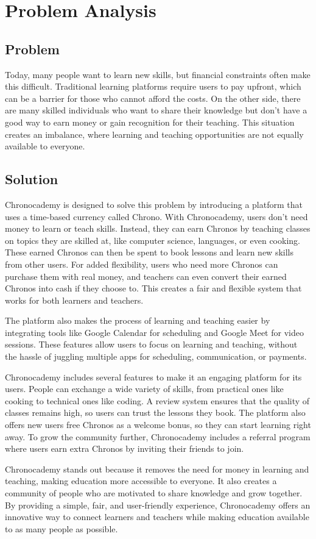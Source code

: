 \section{Problem Analysis}\label{sec:problem-analisys}

\subsection{Problem}\label{subsec:problem}
Today, many people want to learn new skills, but financial constraints often make this difficult.
Traditional learning platforms require users to pay upfront, which can be a barrier for those who cannot afford the costs.
On the other side, there are many skilled individuals who want to share their knowledge but don’t have a good way to earn money or gain recognition for their teaching.
This situation creates an imbalance, where learning and teaching opportunities are not equally available to everyone.

\subsection{Solution}\label{subsec:solution}
Chronocademy is designed to solve this problem by introducing a platform that
uses a time-based currency called Chrono.
With Chronocademy, users don’t need money to learn or teach skills.
Instead, they can earn Chronos by teaching classes on topics they are skilled at, like computer science, languages, or even cooking.
These earned Chronos can then be spent to book lessons and learn new
skills from other users.
For added flexibility, users who need more Chronos can purchase them with real money, and teachers can even convert their earned
Chronos into cash if they choose to.
This creates a fair and flexible system
that works for both learners and teachers.

The platform also makes the process of learning and teaching easier by integrating tools like Google Calendar for scheduling and Google Meet for video sessions.
These features allow users to focus on learning and teaching, without the hassle of juggling multiple apps for scheduling, communication, or payments.

Chronocademy includes several features to make it an engaging platform for its
users.
People can exchange a wide variety of skills, from practical ones like
cooking to technical ones like coding.
A review system ensures that the quality of classes remains high, so users can trust the lessons they book.
The platform also offers new users free Chronos as a welcome bonus, so
they can start learning right away.
To grow the community further,
Chronocademy includes a referral program where users earn extra Chronos by
inviting their friends to join.

Chronocademy stands out because it removes the need for money in learning and teaching, making education more accessible to everyone.
It also creates a community of people who are motivated to share knowledge and grow together.
By providing a simple, fair, and user-friendly experience, Chronocademy offers an innovative way to connect learners and teachers while making education available to as many people as possible.
